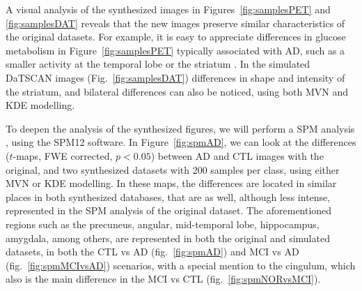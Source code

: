 A visual analysis of the synthesized images in Figures~\ref{fig:samplesPET} and \ref{fig:samplesDAT} reveals that the new images preserve similar characteristics of the original datasets. For example, it is easy to appreciate differences in glucose metabolism in Figure~\ref{fig:samplesPET} typically associated with \ac{AD}, such as a smaller activity at the temporal lobe or the striatum \cite{Stoeckel04,Illan2011}. In the simulated DaTSCAN images (Fig.~\ref{fig:samplesDAT}) differences in shape and intensity of the striatum, and bilateral differences \cite{Towey2011,Illan2012,martinez2014parametrization} can also be noticed, using both \ac{MVN} and \ac{KDE} modelling.

To deepen the analysis of the synthesized figures, we will perform a \ac{SPM} analysis \cite{spm_book}, using the SPM12 software. In Figure~\ref{fig:spmAD}, we can look at the differences ($t$-maps, FWE corrected, $p<0.05$) between \ac{AD} and \ac{CTL} images with the original, and two synthesized datasets with 200 samples per class, using either \ac{MVN} or \ac{KDE} modelling. In these maps, the differences are located in similar places in both synthesized databases, that are as well, although less intense, represented in the \ac{SPM} analysis of the original dataset. The aforementioned regions such as the precuneus, angular, mid-temporal lobe, hippocampus, amygdala, among others, are represented in both the original and simulated datasets, in both the \ac{CTL} vs \ac{AD} (fig.~\ref{fig:spmAD}) and \ac{MCI} vs \ac{AD} (fig.~\ref{fig:spmMCIvsAD}) scenarios, with a special mention to the cingulum, which also is the main difference in the \ac{MCI} vs \ac{CTL} (fig.~\ref{fig:spmNORvsMCI}). 

